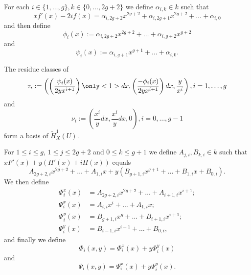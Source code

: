 \documentclass{beamer}
\begin{document}



\begin{frame}
For each $i \in \{1, \ldots, g\}, k \in \{0, \ldots , 2g+2\}$ we define $\alpha_{i,k}\in k$ such that
\[
xf'(x) - 2if(x) = \alpha_{i,2g+2}x^{2g+2} + \alpha_{i, 2g+1}x^{2g+2} + \ldots + \alpha_{i,0}
\]
and then define
\[
\phi_i(x)  := \alpha_{i,2g+2}x^{2g+2} + \ldots + \alpha_{i,g+2}x^{g+2} 
\]
and
\[
\psi_i(x) := \alpha_{i,g+1}x^{g+1} + \ldots + \alpha_{i,0}.
\]
\pause
\begin{theorem}
The residue classes of
\[
\tau_i := \left( \left( \frac{\psi_i(x)}{2yx^{i+1}} \right) \only<1>{dx}, \left(\frac{-\phi_i(x)}{2yx^{i+1}} \right)dx, \frac{y}{x^i} \right), i= 1, \ldots, g
\]
and
\[
\nu_i := \left( \frac{x^i}{y}dx, \frac{x^i}{y}dx, 0 \right), i = 0, \ldots, g-1
\]
form a basis of $\check{H}^1_X(U)$.
\end{theorem}
\end{frame}




\begin{frame}
For $1 \leq i \leq g$, $1 \leq j \leq 2g+2$ and $0 \leq k \leq g+1$ we define $A_{j,i}, B_{k,i} \in k$ such that $xF'(x) + y(H'(x) + iH(x))$ equals
\[
A_{2g+2,i}x^{2g+2} + \dots + A_{1,i}x + y (B_{g+1,i}x^{g+1} + \dots + B_{1,i}x + B_{0,i}).
\]
\pause
We then define
\begin{align*}
\Phi_i^x(x) & = A_{2g+2,i}x^{2g+2} + \dots + A_{i+1,i}x^{i+1};\\
\Psi_i^x(x) & = A_{i,i}x^i + \dots + A_{1,i}x;\\
\Phi_i^y(x) & = B_{g+1,i}x^g + \dots + B_{i+1,i}x^{i+1};\\
\Psi_i^y(x) & = B_{i-1,i}x^{i-1} + \dots + B_{0,i},
\end{align*}
and finally we define 
\[
\Phi_i(x,y) = \Phi_i^x(x) + y\Phi_i^y(x)
\]
and 
\[
\Psi_i(x,y) = \Psi_i^x(x) + y\Psi_i^y(x).
\]

\end{frame}
\end{document}
